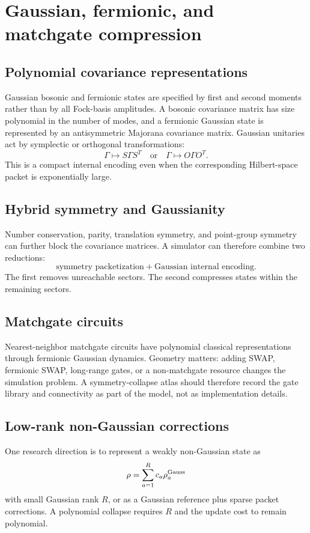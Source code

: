 \chapter{Gaussian, fermionic, and matchgate compression}
\label{ch:gaussian}

\section{Polynomial covariance representations}
Gaussian bosonic and fermionic states are specified by first and second moments rather than by all Fock-basis amplitudes. A bosonic covariance matrix has size polynomial in the number of modes, and a fermionic Gaussian state is represented by an antisymmetric Majorana covariance matrix. Gaussian unitaries act by symplectic or orthogonal transformations:
\[
\Gamma\longmapsto S\Gamma S^T
\quad\text{or}\quad
\Gamma\longmapsto O\Gamma O^T.
\]
This is a compact internal encoding even when the corresponding Hilbert-space packet is exponentially large.

\section{Hybrid symmetry and Gaussianity}
Number conservation, parity, translation symmetry, and point-group symmetry can further block the covariance matrices. A simulator can therefore combine two reductions:
\[
\text{symmetry packetization}
+
\text{Gaussian internal encoding}.
\]
The first removes unreachable sectors. The second compresses states within the remaining sectors.

\section{Matchgate circuits}
Nearest-neighbor matchgate circuits have polynomial classical representations through fermionic Gaussian dynamics. Geometry matters: adding SWAP, fermionic SWAP, long-range gates, or a non-matchgate resource changes the simulation problem. A symmetry-collapse atlas should therefore record the gate library and connectivity as part of the model, not as implementation details.

\section{Low-rank non-Gaussian corrections}
One research direction is to represent a weakly non-Gaussian state as
\[
\rho
=
\sum_{a=1}^R c_a\rho_a^{\rm Gauss}
\]
with small Gaussian rank $R$, or as a Gaussian reference plus sparse packet corrections. A polynomial collapse requires $R$ and the update cost to remain polynomial.

